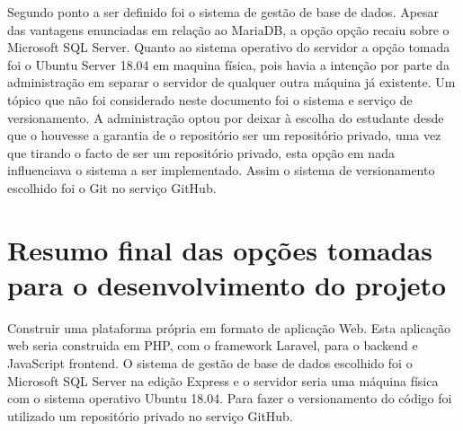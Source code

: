 Segundo ponto a ser definido foi o sistema de gestão de base de dados. Apesar das vantagens enunciadas em relação ao MariaDB, a opção opção recaiu sobre o Microsoft SQL Server. Quanto ao sistema operativo do servidor a opção tomada foi o Ubuntu Server 18.04 em maquina física, pois havia a intenção por parte da administração em separar o servidor de qualquer outra máquina já existente.
Um tópico que não foi considerado neste documento foi o sistema e serviço de versionamento. A administração optou por deixar à escolha do estudante desde que o houvesse a garantia de o repositório ser um repositório privado, uma vez que tirando o facto de ser um repositório privado, esta opção em nada influenciava o sistema a ser implementado. Assim o sistema de versionamento escolhido foi o Git no serviço GitHub.

\section{Resumo final das opções tomadas para o desenvolvimento do projeto}
Construir uma plataforma própria em formato de aplicação Web. Esta aplicação web seria construida em PHP, com o framework Laravel, para o backend e JavaScript frontend. O sistema de gestão de base de dados escolhido foi o Microsoft SQL Server na edição Express e o servidor seria uma máquina física com o sistema operativo Ubuntu 18.04. Para fazer o versionamento do código foi utilizado um repositório privado no serviço GitHub.